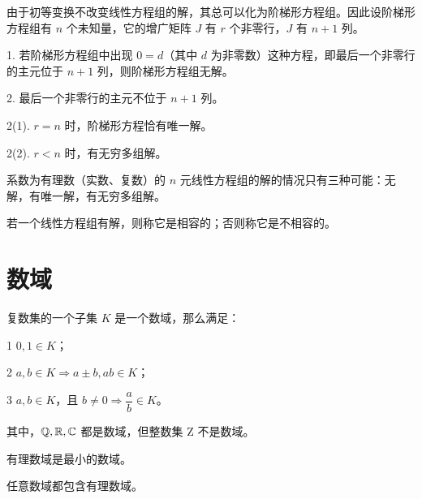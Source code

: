 由于初等变换不改变线性方程组的解，其总可以化为阶梯形方程组。因此设阶梯形方程组有 $n$ 个未知量，它的增广矩阵 $J$ 有 $r$ 个非零行，$J$ 有 $n+1$ 列。

1. 若阶梯形方程组中出现 $0=d$（其中 $d$ 为非零数）这种方程，即最后一个非零行的主元位于 $n+1$ 列，则阶梯形方程组无解。

2. 最后一个非零行的主元不位于 $n+1$ 列。

2(1). $r=n$ 时，阶梯形方程恰有唯一解。

2(2). $r<n$ 时，有无穷多组解。

\begin{theorem}
	系数为有理数（实数、复数）的 $n$ 元线性方程组的解的情况只有三种可能：无解，有唯一解，有无穷多组解。
\end{theorem}

若一个线性方程组有解，则称它是相容的；否则称它是不相容的。

\section{数域}

\begin{definition}
	复数集的一个子集 $K$ 是一个数域，那么满足：
	
	\num{1} $0,1\in K$；
	
	\num{2} $a,b\in K \Rightarrow a \pm b,ab\in K$；
	
	\num{3} $a,b \in K$，且 $b\ne 0 \Rightarrow \dfrac{a}{b}\in K$。
\end{definition}

其中，$\mathbb{Q},\mathbb{R},\mathbb{C}$ 都是数域，但整数集 $\mathrm{Z}$ 不是数域。

有理数域是最小的数域。

\begin{theorem}
	任意数域都包含有理数域。
\end{theorem}


